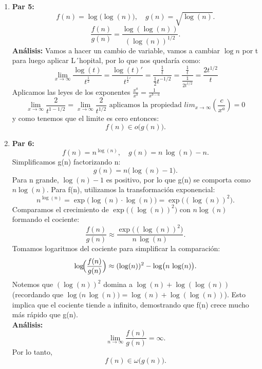 \documentclass[12pt]{article}
\begin{document}
\begin{enumerate}
  \item \textbf{Par 5:}
  \[
    f(n) = \log\bigl(\log(n)\bigr), \quad g(n) = \sqrt{\log(n)}.
  \]
  \[
    \frac{f(n)}{g(n)} = \frac{\log(\log(n))}{(\log(n))^{1/2}}.
  \]
  \textbf{Análisis:}
  Vamos a hacer un cambio de variable, vamos a cambiar $\log n$ por t para luego aplicar L´hopital, por lo que nos quedaría como:
  \[
  \lim_{x \to \infty} \frac{\log(t)}{t^{\frac{1}{2}}} = \frac{\log(t)'}{t^{\frac{1}{2}'}} = \frac{\frac{1}{t}}{\frac{1}{2}t^{-1/2}} = \frac{\frac{1}{t}}{\frac{1}{2t^{1/2}}} = \frac{2t^{1/2}}{t} 
  \]
  Aplicamos las leyes de los exponentes $\frac{x^a}{x^b}= \frac{1}{x^{b-a}}$
  \[
  \lim_{x \to \infty} \frac{2}{t^{1-1/2}} = \lim_{x \to \infty} \frac{2}{t^{1/2}} \text{ aplicamos la propiedad } lim_{x \to \infty}(\frac{c}{x^a})= 0
  \]
  y como tenemos que el limite es cero entonces:    
  \[
    f(n) \in o\bigl(g(n)\bigr).
  \]

  \item \textbf{Par 6:}
  \[
    f(n) = n^{\log(n)}, \quad g(n) = n \,\log(n) - n.
  \]
  Simplificamos g(n) factorizando n: 
  \[
    g(n) = n\bigl(\log(n)-1\bigr).
  \]
  Para n grande, \(\log(n)-1\) es positivo, por lo que g(n) se comporta como \(n\log(n)\).
  Para f(n), utilizamos la transformación exponencial:
  \[
    n^{\log(n)} = \exp\bigl(\log(n)\cdot\log(n)\bigr)= \exp\bigl((\log(n))^2\bigr).
  \]
  Comparamos el crecimiento de \(\exp\bigl((\log(n))^2\bigr)\) con \(n\log(n)\) formando el cociente:
  \[
    \frac{f(n)}{g(n)} \approx \frac{\exp\bigl((\log(n))^2\bigr)}{n\,\log(n)}.
  \]
  Tomamos logaritmos del cociente para simplificar la comparación:
  \[
    \log\!\Bigl(\frac{f(n)}{g(n)}\Bigr) \approx (\log(n))^2 - \log\bigl(n\,\log(n)\bigr).
  \]
  Notemos que \((\log(n))^2\) domina a \(\log(n) + \log(\log(n))\) (recordando que \(\log\bigl(n\,\log(n)\bigr) = \log(n) + \log(\log(n))\)). 
   Esto implica que el cociente tiende a infinito, demostrando que f(n) crece mucho más rápido que g(n).\\
  \textbf{Análisis:}
  \[
    \lim_{n\to\infty} \frac{f(n)}{g(n)} = \infty.
  \]
  Por lo tanto,
  \[
    f(n) \in \omega\bigl(g(n)\bigr).
  \]


\end{enumerate}
\end{document}
